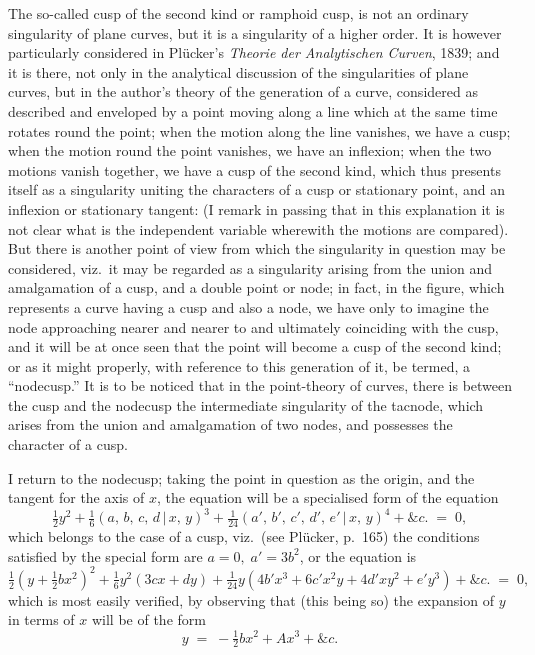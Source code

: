 \documentclass[11pt,a4paper]{article}
\providecommand{\mid}{\,|\,}
\begin{document}
\medskip

The so-called cusp of the second kind or ramphoid cusp, is not an ordinary singularity of plane curves, but it is a singularity of a higher order. It is however particularly considered in Pl\"ucker's \textit{Theorie der Analytischen Curven}, 1839; and it is there, not only in the analytical discussion of the singularities of plane curves, but in the author's theory of the generation of a curve, considered as described and enveloped by a point moving along a line which at the same time rotates round the point; when the motion along the line vanishes, we have a cusp; when the motion round the point vanishes, we have an inflexion; when the two motions vanish together, we have a cusp of the second kind, which thus presents itself as a singularity uniting the characters of a cusp or stationary point, and an inflexion or stationary tangent: (I remark in passing that in this explanation it is not clear what is the independent variable wherewith the motions are compared). But there is another point of view from which the singularity in question may be considered, viz.\ it may be regarded as a singularity arising from the union and amalgamation of a cusp, and a double point or node; in fact, in the figure, which represents a curve having a cusp and also a node, we have only to imagine the node approaching nearer and nearer to and ultimately coinciding with the cusp, and it will be at once seen that the point will become a cusp of the second kind; or as it might properly, with reference to this generation of it, be termed, a ``nodecusp.'' It is to be noticed that in the point-theory of curves, there is between the cusp and the nodecusp the intermediate singularity of the tacnode, which arises from the union and amalgamation of two nodes, and possesses the character of a cusp.

\medskip

I return to the nodecusp; taking the point in question as the origin, and the tangent for the axis of $x$, the equation will be a specialised form of the equation
\[
\tfrac{1}{2}y^2 + \tfrac{1}{6}(a,\,b,\,c,\,d\mid x,\,y)^3 + \tfrac{1}{24}(a',\,b',\,c',\,d',\,e'\mid x,\,y)^4 + \&c. \;=\; 0,
\]
which belongs to the case of a cusp, viz.\ (see Pl\"ucker, p.~165) the conditions satisfied by the special form are $a = 0,\;a' = 3b^2$, or the equation is
\[
\tfrac{1}{2}(y + \tfrac{1}{2}bx^2)^2 + \tfrac{1}{6}y^2(3cx + dy) + \tfrac{1}{24}y(4b'x^3 + 6c'x^2 y + 4d'xy^2 + e'y^3) + \&c. \;=\; 0,
\]
which is most easily verified, by observing that (this being so) the expansion of $y$ in terms of $x$ will be of the form
\[
y \;=\; -\tfrac{1}{2}bx^2 + Ax^3 + \&c.
\]
\end{document}
